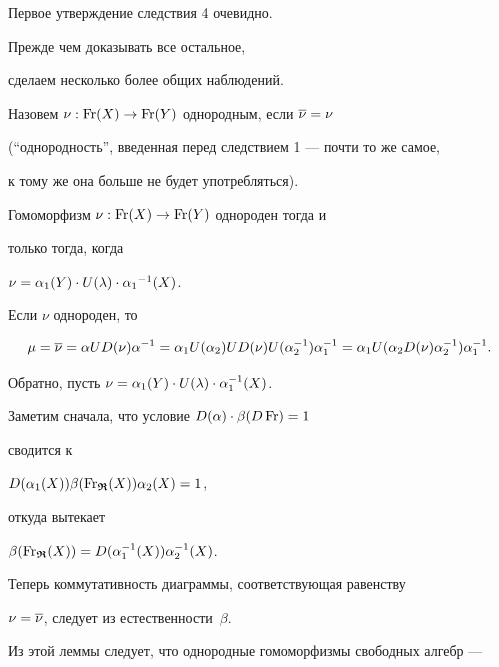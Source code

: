 Первое утверждение следствия 4 очевидно.


Прежде чем доказывать все остальное,


сделаем несколько более общих наблюдений.


Назовем $\nu : \operatorname{Fr}(X) \to \operatorname{Fr}(Y) $ однородным, если $\overline{\nu}=\nu$


(``однородность'', введенная перед следствием 1 --- почти то же самое,


к тому же она больше не будет употребляться).





\begin{lem}


Гомоморфизм $\nu : \operatorname{Fr}(X)\to \operatorname{Fr}(Y)$ однороден тогда и


только тогда, когда


$\nu=\alpha_1(Y)\cdot U(\lambda)\cdot {\alpha_1}^{-1}(X)$.


\end{lem}





\begin{pf} Если $\nu$ однороден, то


$$


\mu=\o{\nu}=\alpha UD(\nu)\alpha^{-1}=


\alpha_1 U(\alpha_2)UD(\nu)U(\alpha_2^{-1})\alpha_1^{-1}=


\alpha_1 U(\alpha_2 D(\nu)\alpha_2^{-1})\alpha_1^{-1}.


$$


Обратно, пусть $\nu=\alpha_1(Y)\cdot U(\lambda)\cdot \alpha_1^{-1}(X)$.


Заметим сначала, что условие $D(\alpha)\cdot\beta(D\operatorname{Fr})=1$


сводится к


$D(\alpha_1(X))\beta(\operatorname{Fr}_{\boldsymbol{\frak R}}(X))\alpha_2(X)=1$,


откуда вытекает


$\beta(\operatorname{Fr}_{\boldsymbol{\frak R}}(X))=D(\alpha_1^{-1}(X))\alpha_2^{-1}(X)$.\linebreak


Теперь коммутативность диаграммы, соответствующая равенству


$\nu=\overline{\nu}$, следует из естественности~$\beta$.


\end{pf}





Из этой леммы следует, что однородные гомоморфизмы свободных алгебр ---


